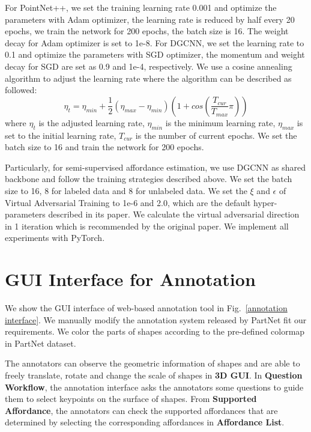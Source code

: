 \documentclass[final]{cvpr}
\begin{document}
For PointNet++, we set the training learning rate 0.001 and optimize the parameters with Adam optimizer, the learning rate is reduced by half every 20 epochs, we train the network for 200 epochs, the batch size is 16. The weight decay for Adam optimizer is set to 1e-8. For DGCNN, we set the learning rate to  0.1 and optimize the parameters with SGD optimizer, the momentum and weight decay for SGD are set as 0.9 and 1e-4, respectively. We use a cosine annealing algorithm to adjust the learning rate where the algorithm can be described as followed:
\begin{equation}
    \eta_{t} = \eta_{min} + \frac{1}{2}(\eta_{max}-\eta_{min})(1+cos(\frac{T_{cur}}{T_{max}}\pi))
\end{equation}
where $\eta_{t}$ is the adjusted learning rate, $\eta_{min}$ is the minimum learning rate, $\eta_{max}$ is set to the initial learning rate, $T_{cur}$ is the number of current epochs. We set the batch size to 16 and train the network for 200 epochs. 

Particularly, for semi-supervised affordance estimation, we use DGCNN as shared backbone and follow the training strategies described above. We set the batch size to 16, 8 for labeled data and 8 for unlabeled data. We set the $\xi$ and $\epsilon$ of Virtual Adversarial Training to 1e-6 and 2.0, which are the default hyper-parameters described in its paper. We calculate the virtual adversarial direction in 1 iteration which is recommended by the original paper. We implement all experiments with PyTorch.



\section{GUI Interface for Annotation} \label{gui interface}

We show the GUI interface of web-based annotation tool in Fig.~\ref{annotation interface}. We manually modify the annotation system released by PartNet fit our requirements. We color the parts of shapes according to the pre-defined colormap in PartNet dataset. 

The annotators can observe the geometric information of shapes and are able to freely translate, rotate and change the scale of shapes in \textbf{3D GUI}. In \textbf{Question Workflow}, the annotation interface asks the annotators some questions to guide them to select keypoints on the surface of shapes. From \textbf{Supported Affordance}, the annotators can check the supported affordances that are determined by selecting the corresponding affordances in \textbf{Affordance List}. 
\end{document}
